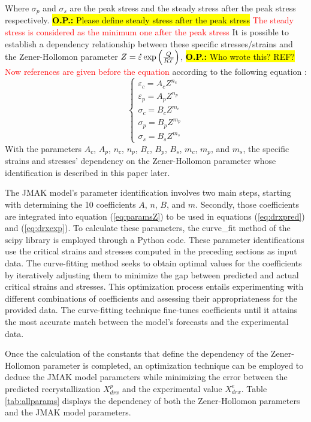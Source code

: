 \documentclass[metals,article,submit,pdftex,moreauthors]{Definitions/mdpi}
\DeclareRobustCommand{\mdot}[1]{\accentset{\mbox{\bfseries .}}{#1}}
\DeclareRobustCommand{\OP}[1]{\begingroup\sethlcolor{VWyellow}\textcolor{red}{\hl{\textbf{O.P.:} #1}}\endgroup}
\begin{document}
Where $\sigma_p$ and $\sigma_s$ are the peak stress and the steady stress after the peak stress respectively. \OP{Please define steady stress after the peak stress} \textcolor{red}{The steady stress is considered as the minimum one after the peak stress}
It is possible to establish a dependency relationship between these specific stresses/strains and the Zener-Hollomon parameter $Z = \mdot\varepsilon \exp{\left(\frac{Q}{RT}\right)} \label{eq:ArZ}$, \OP{Who wrote this? REF?} \textcolor{red}{Now references are given before the equation} according to the following equation \cite{chen2014dynamic,li2019effect,wang2021artificial}:
\begin{equation}
\begin{cases}
\varepsilon_c = A_cZ^{n_c} \\ \varepsilon_p = A_pZ^{n_p} \\ \sigma_c = B_cZ^{m_c} \\ \sigma_p = B_pZ^{m_p}\\ \sigma_s = B_sZ^{m_s}
\end{cases}
\label{eq:paramsZ}
\end{equation}
With the parameters $A_c$, $A_p$, $n_c$, $n_p$, $B_c$, $B_p$, $B_s$, $m_c$, $m_p$, and $m_s$, the specific strains and stresses' dependency on the Zener-Hollomon parameter whose identification is described in this paper later.

The JMAK model's parameter identification involves two main steps, starting with determining the 10 coefficients $A$, $n$, $B$, and $m$.
Secondly, those coefficients are integrated into equation (\ref{eq:paramsZ}) to be used in equations (\ref{eq:drxpred}) and (\ref{eq:drxexp}).
To calculate these parameters, the curve\_fit method of the scipy library is employed through a Python code.
These parameter identifications use the critical strains and stresses computed in the preceding sections as input data.
The curve-fitting method seeks to obtain optimal values for the coefficients by iteratively adjusting them to minimize the gap between predicted and actual critical strains and stresses.
This optimization process entails experimenting with different combinations of coefficients and assessing their appropriateness for the provided data.
The curve-fitting technique fine-tunes coefficients until it attains the most accurate match between the model's forecasts and the experimental data.

Once the calculation of the constants that define the dependency of the Zener-Hollomon parameter is completed, an optimization technique can be employed to deduce the JMAK model parameters while minimizing the error between the predicted recrystallization $X_{drx}^{p}$ and the experimental value $X_{drx}^{e}$.
Table \ref{tab:allparams} displays the dependency of both the Zener-Hollomon parameters and the JMAK model parameters.
\end{document}
